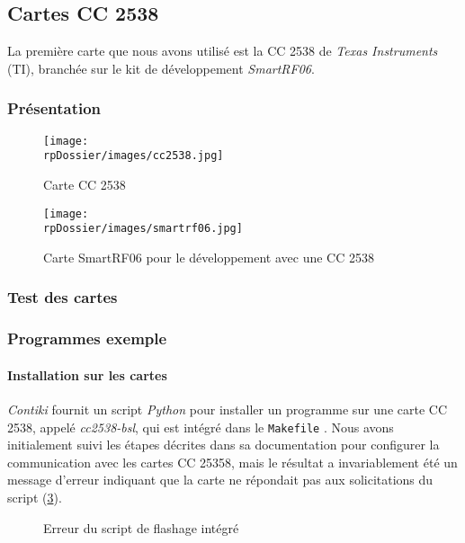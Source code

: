 \subsection{Cartes CC 2538}

La première carte que nous avons utilisé est la CC 2538 de \emph{Texas Instruments} (TI), branchée sur le kit de développement \emph{SmartRF06}.

\subsubsection{Présentation}

\begin{figure}[H]
\centering
\texttt{[image: \\rpDossier/images/cc2538.jpg]}
\caption{Carte CC 2538}
\label{cc2538}
\end{figure}

\begin{figure}[H]
\centering
\texttt{[image: \\rpDossier/images/smartrf06.jpg]}
\caption{Carte SmartRF06 pour le développement avec une CC 2538}
\label{smartrf06}
\end{figure}
\todo[descriptions]

\subsubsection{Test des cartes}


\subsubsection{Programmes exemple}

\paragraph{Installation sur les cartes}

\emph{Contiki} fournit un script \emph{Python} pour installer un programme sur une carte CC 2538, appelé \emph{cc2538-bsl}, qui est intégré dans le \texttt{Makefile} .
Nous avons initialement suivi les étapes décrites dans sa documentation pour configurer la communication avec les cartes CC 25358, mais le résultat a invariablement été un message d’erreur indiquant que la carte ne répondait pas aux solicitations du script (\cref{bsl-error}).

\begin{figure}[H]
\centering
{}
\caption{Erreur du script de flashage intégré}
\label{bsl-error}
\end{figure}

